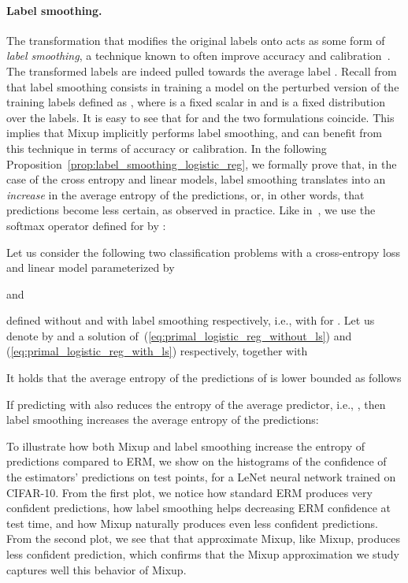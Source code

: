\documentclass[twoside,11pt]{article}
\begin{document}
\paragraph{Label smoothing.}
The transformation that modifies the original labels  onto  acts as some form of \textit{label smoothing}, a technique known to often improve accuracy and calibration~\citep{szegedy2016rethinking,Muller2019When}. The transformed labels  are indeed pulled towards the average label . Recall from \citet{szegedy2016rethinking}
that label smoothing consists in training a model on the perturbed version of the training labels defined as , where  is a fixed
scalar in  and  is a fixed distribution over the labels. 
It is easy to see that for  and  the two formulations coincide. 
This implies that Mixup implicitly performs label smoothing, and can benefit from this technique in terms of accuracy or calibration.
In the following Proposition~\ref{prop:label_smoothing_logistic_reg}, we formally prove that, 
in the case of the cross entropy and linear models, 
label smoothing translates into an \textit{increase} in the average entropy of the predictions, or, 
in other words, that predictions become less certain, as observed in practice. Like in~, we use the softmax operator  defined for  by :
\begin{proposition}\label{prop:label_smoothing_logistic_reg}
Let us consider the following two classification problems with a cross-entropy loss and linear model  parameterized by  

and

defined without and with label smoothing respectively, i.e., with  for . Let us denote by  and  a solution of~(\ref{eq:primal_logistic_reg_without_ls}) and (\ref{eq:primal_logistic_reg_with_ls}) respectively, together with 

It holds that the average entropy of the predictions of  is lower bounded as follows

If predicting with  also reduces the entropy of the average predictor, i.e., , then label smoothing increases the average entropy of the predictions:

\end{proposition}
To illustrate how both Mixup and label smoothing increase the entropy of predictions compared to ERM, we show on  the histograms of 
the confidence of the estimators' predictions on test points, for a LeNet neural network trained on CIFAR-10. 
From the first plot, we notice how standard ERM produces very confident predictions, 
how label smoothing helps decreasing ERM confidence at test time, 
and how Mixup naturally produces even less confident predictions. 
From the second plot, we see that that approximate Mixup, like Mixup, produces less confident prediction, which confirms that the Mixup approximation we study captures well this behavior of Mixup.
\end{document}
